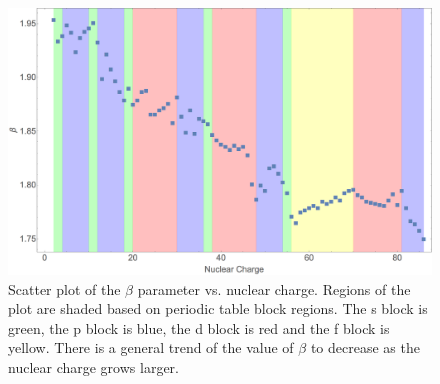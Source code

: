 \begin{figure}
\center
\includegraphics[width=1\textwidth]{Figures/BS_non_rel_beta.png}
\caption[Scatter plot of the $\beta$ parameter vs. nuclear charge.]
{Scatter plot of the $\beta$ parameter vs. nuclear charge. Regions of the plot are shaded based on periodic table block regions. The s block is green, the p block is blue, the d block is red and the f block is yellow. There is a general trend of the value of $\beta$ to decrease as the nuclear charge grows larger.}
\label{fig:BS_non_rel_beta}
\end{figure}

